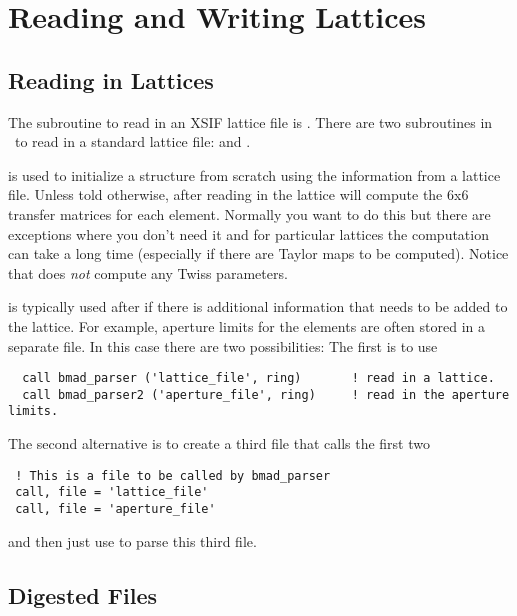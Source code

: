 \chapter{Reading and Writing Lattices}

\section{Reading in Lattices}

The subroutine to read in an XSIF lattice file is .
There are two subroutines in \bmad\ to read in a \bmad standard
lattice file:  and .

 is used to initialize a 
structure from scratch using the information from a lattice
file. Unless told otherwise, after reading in the lattice
 will compute the 6x6 transfer matrices for each
element. Normally you want to do this but there are exceptions where
you don't need it and for particular lattices the computation can take
a long time (especially if there are Taylor maps to be
computed). Notice that  does {\em not} compute any
Twiss parameters.

 is typically used after  if there is
additional information that needs to be added to the lattice. For
example, aperture limits for the elements are often stored in a
separate file. In this case there are two possibilities: The first is
to use 
\begin{verbatim}
  call bmad_parser ('lattice_file', ring)       ! read in a lattice.
  call bmad_parser2 ('aperture_file', ring)     ! read in the aperture limits.
\end{verbatim}
The second alternative is to create a third file that calls the first two
\begin{verbatim}
 ! This is a file to be called by bmad_parser
 call, file = 'lattice_file'
 call, file = 'aperture_file'
\end{verbatim}
and then just use  to parse this third file.

\section{Digested Files}


